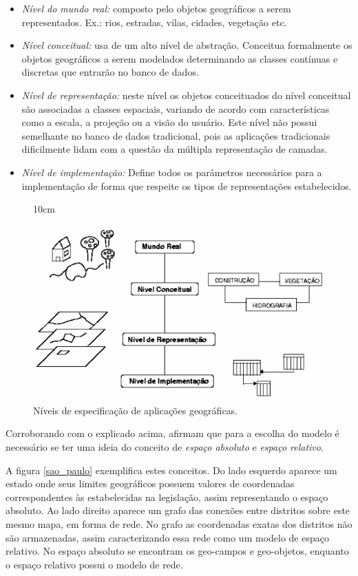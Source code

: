 \begin{itemize}
    \item \textit{Nível do mundo real:} composto pelo objetos geográficos a serem representados. Ex.: rios, estradas, vilas, cidades, vegetação etc.
    \item \textit{Nível conceitual:} usa de um alto nível de abstração. Conceitua formalmente os objetos geográficos a serem modelados determinando as classes contínuas e discretas que entrarão no banco de dados.
    \item \textit{Nível de representação:} neste nível os objetos conceituados do nível conceitual são associadas a classes espaciais, variando de acordo com características como a escala, a projeção ou a visão do usuário. Este nível não possui semelhante no banco de dados tradicional, pois as aplicações tradicionais dificilmente lidam   com a questão da múltipla representação de camadas.
    \item \textit{Nível de implementação:} Define todos os parâmetros necessários para a implementação de forma que respeite os tipos de representações estabelecidos.
\end{itemize}
\begin{figure}[!ht]{10cm}
  \caption{Níveis de especificação de aplicações geográficas.} \label{apli_geo}
  \includegraphics[width=1\hsize]{figuras/apl_geo.png}
\end{figure}

Corroborando com o explicado acima,  afirmam que para a escolha do modelo é necessário se ter uma ideia do conceito de \textit{espaço absoluto} e \textit{espaço relativo}. 

A figura \ref{sao_paulo} exemplifica estes conceitos. Do lado esquerdo aparece um estado onde seus limites geográficos possuem valores de coordenadas correspondentes às estabelecidas na legislação, assim representando o espaço absoluto. Ao lado direito aparece um grafo das conexões entre distritos sobre este mesmo mapa, em forma de rede. No grafo as coordenadas exatas dos distritos não são armazenadas, assim caracterizando essa rede como um modelo de espaço relativo.
No espaço absoluto se encontram os geo-campos e geo-objetos, enquanto o espaço relativo possui o modelo de rede. 

